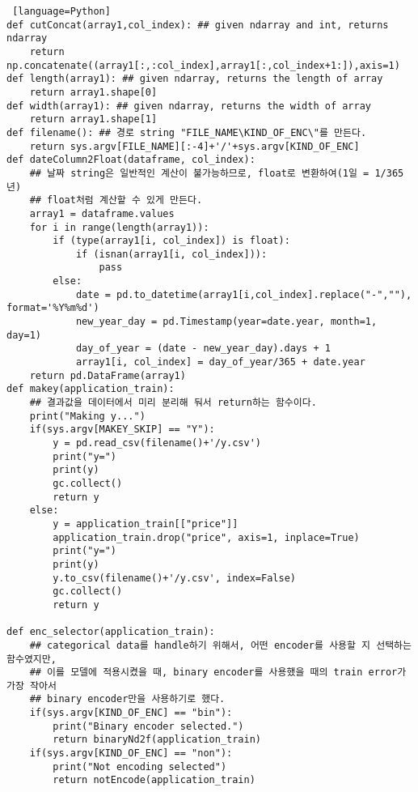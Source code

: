 \documentclass{article}
\begin{document}
\begin{lstlisting} [language=Python]
def cutConcat(array1,col_index): ## given ndarray and int, returns ndarray
    return np.concatenate((array1[:,:col_index],array1[:,col_index+1:]),axis=1)
def length(array1): ## given ndarray, returns the length of array
    return array1.shape[0]
def width(array1): ## given ndarray, returns the width of array
    return array1.shape[1]
def filename(): ## 경로 string "FILE_NAME\KIND_OF_ENC\"를 만든다.
    return sys.argv[FILE_NAME][:-4]+'/'+sys.argv[KIND_OF_ENC]
def dateColumn2Float(dataframe, col_index):
    ## 날짜 string은 일반적인 계산이 불가능하므로, float로 변환하여(1일 = 1/365년)
    ## float처럼 계산할 수 있게 만든다.
    array1 = dataframe.values
    for i in range(length(array1)):
        if (type(array1[i, col_index]) is float):
            if (isnan(array1[i, col_index])):
                pass
        else:
            date = pd.to_datetime(array1[i,col_index].replace("-",""), format='%Y%m%d')
            new_year_day = pd.Timestamp(year=date.year, month=1, day=1)
            day_of_year = (date - new_year_day).days + 1
            array1[i, col_index] = day_of_year/365 + date.year
    return pd.DataFrame(array1)
def makey(application_train):
    ## 결과값을 데이터에서 미리 분리해 둬서 return하는 함수이다.
    print("Making y...")
    if(sys.argv[MAKEY_SKIP] == "Y"):
        y = pd.read_csv(filename()+'/y.csv')
        print("y=")
        print(y)
        gc.collect()
        return y
    else:
        y = application_train[["price"]]
        application_train.drop("price", axis=1, inplace=True)
        print("y=")
        print(y)
        y.to_csv(filename()+'/y.csv', index=False)
        gc.collect()
        return y

def enc_selector(application_train):
    ## categorical data를 handle하기 위해서, 어떤 encoder를 사용할 지 선택하는 함수였지만,
    ## 이를 모델에 적용시켰을 때, binary encoder를 사용했을 때의 train error가 가장 작아서
    ## binary encoder만을 사용하기로 했다.
    if(sys.argv[KIND_OF_ENC] == "bin"):
        print("Binary encoder selected.")
        return binaryNd2f(application_train)
    if(sys.argv[KIND_OF_ENC] == "non"):
        print("Not encoding selected")
        return notEncode(application_train)
        

\end{lstlisting}
\end{document}
